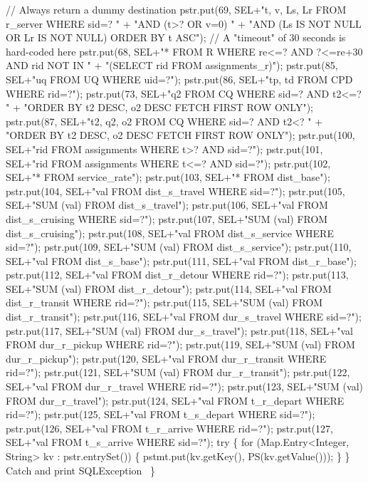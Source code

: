\documentclass{article}
\def\nwendcode{\endtrivlist \endgroup}
\theoremstyle{definition}
\begin{document}
  // Always return a dummy destination
  pstr.put(69, SEL+"t, v, Ls, Lr FROM r_server WHERE sid=? "
      + "AND (t>? OR v=0) "
      + "AND (Ls IS NOT NULL OR Lr IS NOT NULL) ORDER BY t ASC");
  // A "timeout" of 30 seconds is hard-coded here
  pstr.put(68, SEL+"* FROM R WHERE re<=? AND ?<=re+30 AND rid NOT IN  "
      + "(SELECT rid FROM assignments_r)");
  pstr.put(85, SEL+"uq FROM UQ WHERE uid=?");
  pstr.put(86, SEL+"tp, td FROM CPD WHERE rid=?");
  pstr.put(73, SEL+"q2 FROM CQ WHERE sid=? AND t2<=? "
      + "ORDER BY t2 DESC, o2 DESC FETCH FIRST ROW ONLY");
  pstr.put(87, SEL+"t2, q2, o2 FROM CQ WHERE sid=? AND t2<? "
      + "ORDER BY t2 DESC, o2 DESC FETCH FIRST ROW ONLY");
  pstr.put(100, SEL+"rid FROM assignments WHERE t>? AND sid=?");
  pstr.put(101, SEL+"rid FROM assignments WHERE t<=? AND sid=?");
  pstr.put(102, SEL+"* FROM service_rate");
  pstr.put(103, SEL+"* FROM dist_base");
  pstr.put(104, SEL+"val FROM dist_s_travel WHERE sid=?");
  pstr.put(105, SEL+"SUM (val) FROM dist_s_travel");
  pstr.put(106, SEL+"val FROM dist_s_cruising WHERE sid=?");
  pstr.put(107, SEL+"SUM (val) FROM dist_s_cruising");
  pstr.put(108, SEL+"val FROM dist_s_service WHERE sid=?");
  pstr.put(109, SEL+"SUM (val) FROM dist_s_service");
  pstr.put(110, SEL+"val FROM dist_s_base");
  pstr.put(111, SEL+"val FROM dist_r_base");
  pstr.put(112, SEL+"val FROM dist_r_detour WHERE rid=?");
  pstr.put(113, SEL+"SUM (val) FROM dist_r_detour");
  pstr.put(114, SEL+"val FROM dist_r_transit WHERE rid=?");
  pstr.put(115, SEL+"SUM (val) FROM dist_r_transit");
  pstr.put(116, SEL+"val FROM dur_s_travel WHERE sid=?");
  pstr.put(117, SEL+"SUM (val) FROM dur_s_travel");
  pstr.put(118, SEL+"val FROM dur_r_pickup WHERE rid=?");
  pstr.put(119, SEL+"SUM (val) FROM dur_r_pickup");
  pstr.put(120, SEL+"val FROM dur_r_transit WHERE rid=?");
  pstr.put(121, SEL+"SUM (val) FROM dur_r_transit");
  pstr.put(122, SEL+"val FROM dur_r_travel WHERE rid=?");
  pstr.put(123, SEL+"SUM (val) FROM dur_r_travel");
  pstr.put(124, SEL+"val FROM t_r_depart WHERE rid=?");
  pstr.put(125, SEL+"val FROM t_s_depart WHERE sid=?");
  pstr.put(126, SEL+"val FROM t_r_arrive WHERE rid=?");
  pstr.put(127, SEL+"val FROM t_s_arrive WHERE sid=?");
  try \{
    for (Map.Entry<Integer, String> kv : pstr.entrySet()) \{
      pstmt.put(kv.getKey(), PS(kv.getValue()));
    \}
  \}
  \LA{}Catch and print \code{}SQLException\edoc{}~{\nwtagstyle{}}\RA{}
\}
\eatline
{}\nwendcode{}
\end{document}
